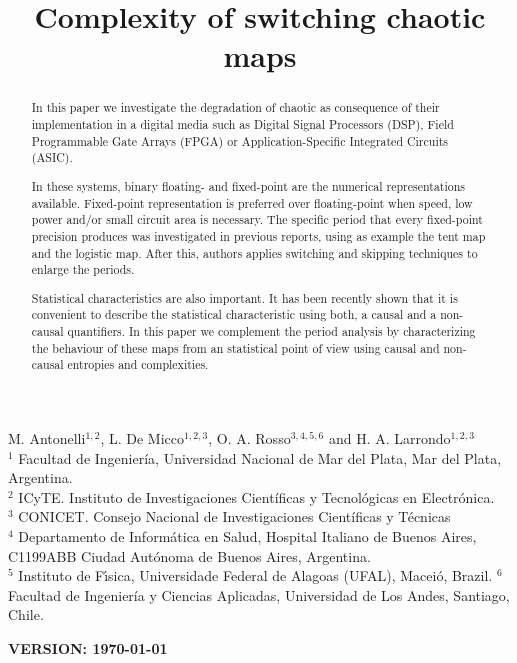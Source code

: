\begin{frontmatter}

	\title{Complexity of switching chaotic maps}
	M. Antonelli$^{1,2}$, L. De Micco$^{1,2,3}$, O. A. Rosso$^{3,4,5,6}$ and H. A. Larrondo$^{1,2,3}$\\
	$^{1}$ Facultad de Ingenier\'ia, Universidad Nacional de Mar del Plata, Mar del Plata, Argentina.\\
	$^{2}$ ICyTE. Instituto de Investigaciones Científicas y Tecnológicas en Electrónica.\\
	$^{3}$ CONICET. Consejo Nacional de Investigaciones Científicas y Técnicas\\
	$^{4}$ Departamento de 
	Inform\'atica en Salud, Hospital Italiano de Buenos Aires,   C1199ABB Ciudad Autónoma de Buenos Aires, Argentina.\\
	$^{5}$ Instituto de F\'{\i}sica, Universidade Federal de Alagoas (UFAL), Macei\'o, Brazil.
	$^{6}$ Facultad de Ingeniería y Ciencias Aplicadas, Universidad de Los Andes, Santiago, Chile.
	

\begin{abstract}

In this paper we investigate the degradation of chaotic as consequence of their implementation in a digital media such as Digital Signal Processors (DSP), Field Programmable Gate Arrays (FPGA) or Application-Specific Integrated Circuits (ASIC).

In these systems, binary floating- and fixed-point are the numerical representations available.
Fixed-point representation is preferred over floating-point when speed, low power and/or small circuit area is necessary.
The specific period that every fixed-point precision produces was investigated in previous reports, using as example the tent map and the logistic map.
After this, authors applies switching and skipping techniques to enlarge the periods.

Statistical characteristics are also important.
It has been recently shown that it is convenient to describe the statistical characteristic using both, a causal and a non-causal quantifiers.
In this paper we complement the period analysis by characterizing the behaviour of these maps from an statistical point of view using causal and non-causal entropies and complexities.

\end{abstract}
\maketitle
\end{frontmatter}
{\bf VERSION: \today}